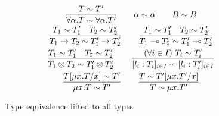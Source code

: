 \begin{figure}[tp]
  \begin{gather*}
    \frac
    {T \sim T'}
    { \forall \alpha.T \sim \forall \alpha. T'}
    \qquad
    \alpha \sim \alpha
    \qquad
    B \sim B
    \\
    \frac
    { T_1 \sim T_1' \quad T_2 \sim T_2'}
    {T_1 \to T_2 \sim T_1' \to T_2'}
    \qquad
    \frac
    { T_1 \sim T_1' \quad T_2 \sim T_2'}
    { T_1 \multimap T_2 \sim T_1' \multimap T_2'}
    \\
    \frac
    {T_1 \sim T_1' \quad T_2 \sim T_2'}
    { T_1 \otimes T_2 \sim T_1' \otimes T_2'}
    \qquad
    \frac
    {(\forall i\in I)~ T_i \sim T_i'}
    { [l_i:T_i]_{i\in I} \sim [l_i:T_i']_{i\in I}}
    \\
    \frac
    { T[{\mu x.T}/{x}] \sim T'}
    { \mu x.T \sim T'}
    \qquad
    \frac
    { T \sim T'[{\mu x.T'}/{x}]}
    { T \sim \mu x.T'}
  \end{gather*}
  \caption{Type equivalence lifted to all types}
  \label{fig:type-equivalence-lifted}
\end{figure}


